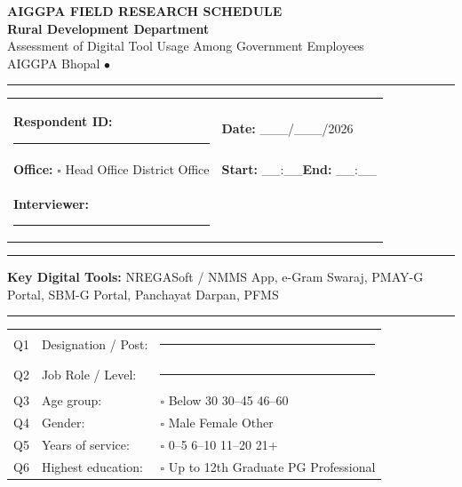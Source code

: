 \documentclass[10pt,a4paper]{article}
\newcommand{\blank}{\rule{8cm}{0.4pt}}
\begin{document}
\begin{center}
{\Large\bfseries AIGGPA FIELD RESEARCH SCHEDULE}\\[3pt]
{\large\bfseries Rural Development Department}\\[3pt]
{\small Assessment of Digital Tool Usage Among Government Employees}\\[2pt]
{\small AIGGPA Bhopal \quad$\bullet$}
\end{center}
\vspace{4pt}\noindent\rule{\textwidth}{1pt}\vspace{4pt}
\noindent\begin{tabularx}{\textwidth}{@{}L{7cm} L{7cm}@{}}
\textbf{Respondent ID:} \blank & \textbf{Date:} \_\_\_/\_\_\_/2026 \\[3pt]
\textbf{Office:} {\Large$\square$} Head Office\quad{\Large$\square$} District Office & \textbf{Start:} \_\_:\_\_\quad\textbf{End:} \_\_:\_\_ \\[3pt]
\textbf{Interviewer:} \blank & \\
\end{tabularx}
\vspace{4pt}\noindent\rule{\textwidth}{0.5pt}\vspace{4pt}

\noindent\textbf{Key Digital Tools:} NREGASoft / NMMS App, e-Gram Swaraj, PMAY-G Portal, SBM-G Portal, Panchayat Darpan, PFMS

\vspace{3pt}

\vspace{4pt}\noindent\rule{\textwidth}{0.5pt}

\vspace{3pt}
\vspace{4pt}

\noindent\begin{tabularx}{\textwidth}{@{}L{0.6cm} L{7.5cm} X@{}}
Q1 & Designation / Post: & \blank \\[3pt]
Q2 & Job Role / Level: & \blank \\[3pt]
Q3 & Age group: & {\Large$\square$} Below 30\quad{\Large$\square$} 30--45\quad{\Large$\square$} 46--60 \\[3pt]
Q4 & Gender: & {\Large$\square$} Male\quad{\Large$\square$} Female\quad{\Large$\square$} Other \\[3pt]
Q5 & Years of service: & {\Large$\square$} 0--5\quad{\Large$\square$} 6--10\quad{\Large$\square$} 11--20\quad{\Large$\square$} 21+ \\[3pt]
Q6 & Highest education: & {\Large$\square$} Up to 12th\quad{\Large$\square$} Graduate\quad{\Large$\square$} PG\quad{\Large$\square$} Professional \\
\end{tabularx}
\end{document}
